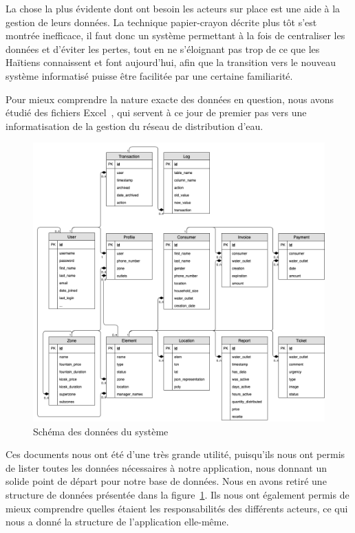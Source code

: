 \documentclass{EPL-master-thesis-covers-FR}
\begin{document}
				La chose la plus évidente dont ont besoin les acteurs sur place est une aide à la gestion de leurs données. La technique papier-crayon décrite plus tôt s'est montrée inefficace, il faut donc un système permettant à la fois de centraliser les données et d'éviter les pertes, tout en ne s'éloignant pas trop de ce que les Haïtiens connaissent et font aujourd'hui, afin que la transition vers le nouveau système informatisé puisse être facilitée par une certaine familiarité.

				Pour mieux comprendre la nature exacte des données en question, nous avons étudié des fichiers Excel~\cite{ref:resumes_documents}, qui servent à ce jour de premier pas vers une informatisation de la gestion du réseau de distribution d'eau.

				\begin{figure}[ht!]
					\centering
					\includegraphics[width=\textwidth]{images/db}
					\caption{Schéma des données du système}
					\label{fig:db}
				\end{figure}

				Ces documents nous ont été d'une très grande utilité, puisqu'ils nous ont permis de lister toutes les données nécessaires à notre application, nous donnant un solide point de départ pour notre base de données. Nous en avons retiré une structure de données présentée dans la figure~\ref{fig:db}. Ils nous ont également permis de mieux comprendre quelles étaient les responsabilités des différents acteurs, ce qui nous a donné la structure de l'application elle-même.
\end{document}
